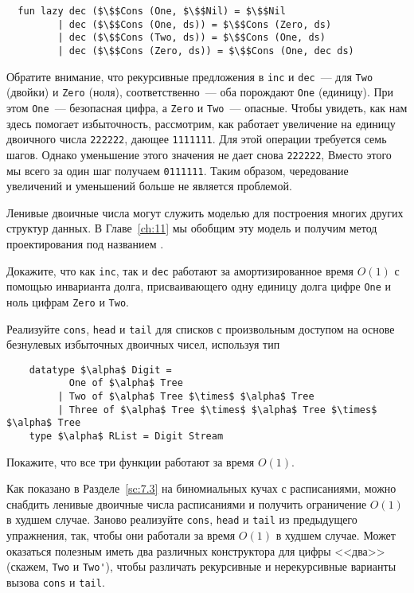\begin{frame}[fragile]{}
\begin{lstlisting}
  fun lazy dec ($\$$Cons (One, $\$$Nil) = $\$$Nil
         | dec ($\$$Cons (One, ds)) = $\$$Cons (Zero, ds)
         | dec ($\$$Cons (Two, ds)) = $\$$Cons (One, ds)
         | dec ($\$$Cons (Zero, ds)) = $\$$Cons (One, dec ds)
\end{lstlisting}
Обратите внимание, что рекурсивные предложения в \lstinline!inc! и
\lstinline!dec!~--- для \lstinline!Two! (двойки) и \lstinline!Zero! (ноля),
соответственно~--- оба порождают \lstinline!One! (единицу). При этом
\lstinline!One!~--- безопасная цифра, а \lstinline!Zero! и
\lstinline!Two!~--- опасные. Чтобы увидеть, как нам здесь помогает
избыточность, рассмотрим, как работает увеличение на единицу двоичного
числа \texttt{222222}, дающее \texttt{1111111}. Для этой операции
требуется семь шагов. Однако уменьшение этого значения не дает снова
\texttt{222222}, Вместо этого мы всего за один шаг получаем
\texttt{0111111}. Таким образом, чередование увеличений и уменьшений
больше не является проблемой.

Ленивые двоичные числа могут служить моделью для построения многих других
структур данных. В Главе~\ref{ch:11} мы обобщим эту модель и получим
метод проектирования под названием .

\begin{exercise}\label{ex:9.8}
  Докажите, что как \lstinline!inc!, так и \lstinline!dec! работают за
  амортизированное время $O(1)$ с помощью инварианта долга,
  присваивающего одну единицу долга цифре \lstinline!One! и ноль цифрам
  \lstinline!Zero! и \lstinline!Two!.
\end{exercise}

\begin{exercise}\label{ex:9.9}
  Реализуйте \lstinline!cons!, \lstinline!head! и \lstinline!tail! для
  списков с произвольным доступом на основе безнулевых избыточных
  двоичных чисел, используя тип
  \begin{lstlisting}
    datatype $\alpha$ Digit =
           One of $\alpha$ Tree
         | Two of $\alpha$ Tree $\times$ $\alpha$ Tree
         | Three of $\alpha$ Tree $\times$ $\alpha$ Tree $\times$ $\alpha$ Tree
    type $\alpha$ RList = Digit Stream
  \end{lstlisting}
  Покажите, что все три функции работают за время $O(1)$.
\end{exercise}

\begin{exercise}\label{ex:9.10}
  Как показано в Разделе~\ref{sc:7.3} на биномиальных кучах с
  расписаниями, можно снабдить ленивые двоичные числа расписаниями и
  получить ограничение $O(1)$ в худшем случае. Заново реализуйте
  \lstinline!cons!, \lstinline!head! и \lstinline!tail! из предыдущего
  упражнения, так, чтобы они работали за время $O(1)$ в худшем
  случае. Может оказаться полезным иметь два различных конструктора
  для цифры <<два>> (скажем, \lstinline!Two! и \lstinline!Two'!),
  чтобы различать рекурсивные и нерекурсивные варианты вызова \lstinline!cons!
  и \lstinline!tail!.
\end{exercise}

\end{frame}

